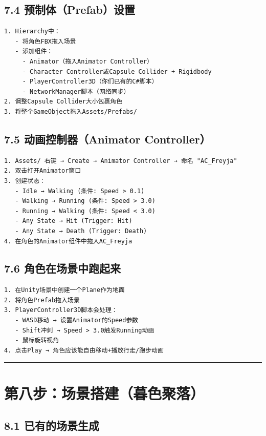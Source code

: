 \documentclass[12pt,a4paper,openany]{ctexbook}
\begin{document}
\subsection*{7.4 预制体（Prefab）设置}


\begin{verbatim}
1. Hierarchy中：
   - 将角色FBX拖入场景
   - 添加组件：
     - Animator（拖入Animator Controller）
     - Character Controller或Capsule Collider + Rigidbody
     - PlayerController3D（你们已有的C#脚本）
     - NetworkManager脚本（网络同步）
2. 调整Capsule Collider大小包裹角色
3. 将整个GameObject拖入Assets/Prefabs/
\end{verbatim}


\subsection*{7.5 动画控制器（Animator Controller）}


\begin{verbatim}
1. Assets/ 右键 → Create → Animator Controller → 命名 "AC_Freyja"
2. 双击打开Animator窗口
3. 创建状态：
   - Idle → Walking (条件: Speed > 0.1)
   - Walking → Running (条件: Speed > 3.0)
   - Running → Walking (条件: Speed < 3.0)
   - Any State → Hit (Trigger: Hit)
   - Any State → Death (Trigger: Death)
4. 在角色的Animator组件中拖入AC_Freyja
\end{verbatim}


\subsection*{7.6 角色在场景中跑起来}


\begin{verbatim}
1. 在Unity场景中创建一个Plane作为地面
2. 将角色Prefab拖入场景
3. PlayerController3D脚本会处理：
   - WASD移动 → 设置Animator的Speed参数
   - Shift冲刺 → Speed > 3.0触发Running动画
   - 鼠标旋转视角
4. 点击Play → 角色应该能自由移动+播放行走/跑步动画
\end{verbatim}


\bigskip\hrule\bigskip


\section*{第八步：场景搭建（暮色聚落）}


\subsection*{8.1 已有的场景生成}
\end{document}

